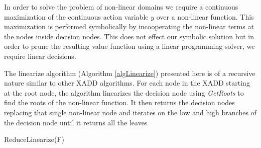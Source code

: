 \documentclass[twoside,11pt]{article}
\begin{document}
In order to solve the problem of non-linear domains we require a continuous maximization of the continuous action variable $y$ over a non-linear function. This maximization is performed symbolically by incooperating the non-linear terms at the nodes inside decision nodes. This does not effect our symbolic solution but in order to prune the resulting value function using a linear programming solver, we require linear decisions. 

The linearize algorithm (Algorithm \ref{algLinearize}) presented here is of a recursive nature similar to other XADD algorithms. For each node in the XADD starting at the root node, the algorithm linearizes the decision node using \emph{GetRoots} to find the roots of the non-linear function. It then returns the decision nodes replacing that single non-linear node and  iterates on the low and high branches of the decision node until it returns all the leaves 			
\incmargin{1em}
\linesnumbered
\begin{algorithm}[t!]

\BlankLine
{}
\caption{{\sc ReduceLinearize}(F)  \label{algLinearize}}
\end{algorithm}
\decmargin{1em}
%
\end{document}
